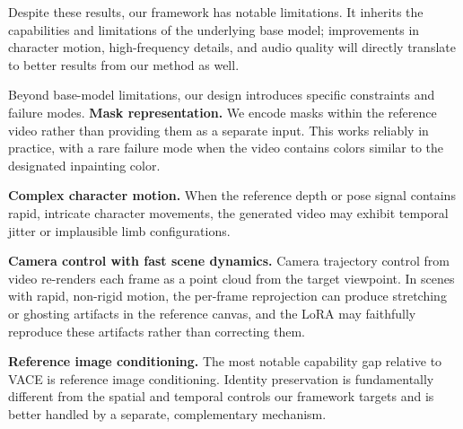 Despite these results, our framework has notable limitations.
It inherits the capabilities and limitations of the underlying base model; improvements in character motion, high-frequency details, and audio quality will directly translate to better results from our method as well.

Beyond base-model limitations, our design introduces specific constraints and failure modes.
\textbf{Mask representation.}
We encode masks within the reference video rather than providing them as a separate input. This works reliably in practice, with a rare failure mode when the video contains colors similar to the designated inpainting color.

\textbf{Complex character motion.}
When the reference depth or pose signal contains rapid, intricate character movements, the generated video may exhibit temporal jitter or implausible limb configurations.

\textbf{Camera control with fast scene dynamics.}
Camera trajectory control from video re-renders each frame as a point cloud from the target viewpoint. In scenes with rapid, non-rigid motion, the per-frame reprojection can produce stretching or ghosting artifacts in the reference canvas, and the LoRA may faithfully reproduce these artifacts rather than correcting them.

\textbf{Reference image conditioning.}
The most notable capability gap relative to VACE is reference image conditioning. Identity preservation is fundamentally different from the spatial and temporal controls our framework targets and is better handled by a separate, complementary mechanism.
